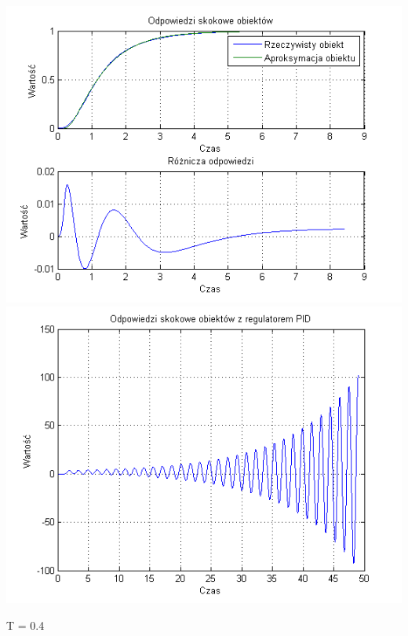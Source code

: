 \documentclass[10pt,a4paper]{article}
\begin{document}
\begin{center}
\includegraphics[scale=1]{images/dwa/skrypt_251.png}\\
\includegraphics[scale=1]{images/dwa/skrypt_252.png}\\
\end{center}
\newpage
T = 0.4
\end{document}
